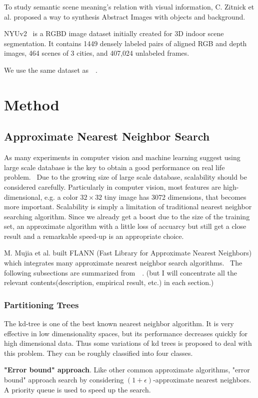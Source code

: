 \documentclass[12pt]{article}
\begin{document}
To study semantic scene meaning's relation with visual information, C. Zitnick et al. proposed a way to synthesis Abstract Images with objects and background.~\citep{zitnickadopting}

NYUv2~\citep{Silberman:ECCV12} is a RGBD image dataset initially created for 3D indoor scene segmentation. It contains 1449 densely labeled  pairs of aligned RGB and depth images, 464 scenes of 3 cities, and 407,024 unlabeled frames.

We use the same dataset as~~\citep{xiao2010sun}.
\section{Method}
\subsection{Approximate Nearest Neighbor Search}
As many experiments in computer vision and machine learning suggest using large scale database is the key to obtain a good performance on real life problem.~\citep{halevy2009unreasonable} Due to the growing size of large scale database, scalability should be considered carefully. Particularly in computer vision, most features are high-dimensional, e.g. a color $32\times 32$ tiny image has 3072 dimensions, that becomes more important. Scalability is simply a limitation of traditional nearest neighbor searching algorithm. Since we already get a boost due to the size of the training set, an approximate algorithm with a little loss of accuarcy but still get a close result and a remarkable speed-up is an appropriate choice.

M. Mujia et al. built FLANN (Fast Library for Approximate Nearest Neighbors) which integrates many approximate nearest neighbor search algorithms.~\citep{muja_flann_2009} The following subsections are summarized from~~\citep{flann_pami_2014}. (but I will concentrate all the relevant contents(description, empirical result, etc.) in each section.)
\subsubsection{Partitioning Trees}
The kd-tree is one of the best known nearest neighbor algorithm. It is very effective in low dimensionality spaces, but its performance decreases quickly for high dimensional data. Thus some variations of kd trees is proposed to deal with this problem. They can be roughly classified into four classes.
	
	\textbf{"Error bound" approach}. Like other common approximate algorithms, "error bound" approach search by considering $(1+\epsilon)$-approximate nearest neighbors. A priority queue is used to speed up the search.
	
\end{document}
